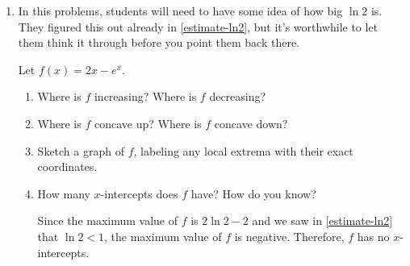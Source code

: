 \documentclass{article}
\begin{document}
\begin{enumerate}
\begin{enumerate}
  \end{enumerate}

\item 

  \begin{workshop}
    In this problems, students will need to have some idea of how big $\ln 2$ is. They figured this out already in \ref{estimate-ln2}, but it's worthwhile to let them think it through before you point them back there. 
  \end{workshop}

  Let $f(x) = 2x - e^x$.

  \begin{enumerate}
  \item

    \begin{problem}[\vfill]
      Where is $f$ increasing? Where is $f$ decreasing? 
    \end{problem}

  \item
    \begin{problem}[\vfill]
      Where is $f$ concave up? Where is $f$ concave down? 
    \end{problem}

  \item
    \begin{problem}[\vfill]
      Sketch a graph of $f$, labeling any local extrema with their exact coordinates. 
    \end{problem}

  \item

    \begin{problem}[0.25in]
      How many $x$-intercepts does $f$ have? How do you know?
    \end{problem}

    \begin{solution}
      Since the maximum value of $f$ is $2 \ln 2 - 2$ and we saw in \ref{estimate-ln2} that $\ln 2 < 1$, the maximum value of $f$ is negative. Therefore, $f$ has no $x$-intercepts.      
    \end{solution}

  \end{enumerate}

\end{enumerate}
\end{document}
